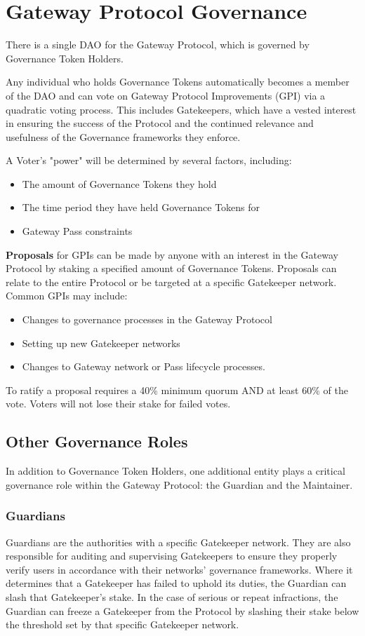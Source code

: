 \section{Gateway Protocol Governance}\label{sec:governance}
There is a single DAO for the Gateway Protocol, which is governed by Governance Token Holders.

Any individual who holds Governance Tokens automatically becomes a member of the DAO and can vote on Gateway Protocol Improvements (GPI) via a quadratic voting process. This includes Gatekeepers, which have a vested interest in ensuring the success of the Protocol and the continued relevance and usefulness of the Governance frameworks they enforce.

A Voter’s "power" will be determined by several factors, including:

\begin{itemize}
\item The amount of Governance Tokens they hold
\item The time period they have held Governance Tokens for
\item Gateway Pass constraints
\end{itemize}

\textbf{Proposals} for GPIs can be made by anyone with an interest in the Gateway Protocol by staking a specified amount of Governance Tokens. Proposals can relate to the entire Protocol or be targeted at a specific Gatekeeper network. Common GPIs may include:

\begin{itemize}
\item Changes to governance processes in the Gateway Protocol
\item Setting up new Gatekeeper networks
\item Changes to Gateway network or Pass lifecycle processes.
\end{itemize}

To ratify a proposal requires a 40\% minimum quorum AND at least 60\% of the vote. Voters will not lose their stake for failed votes.

\subsection{Other Governance Roles}
In addition to Governance Token Holders, one additional entity plays a critical governance role within the Gateway Protocol: the Guardian and the Maintainer.

\subsubsection{Guardians}
Guardians are the authorities with a specific Gatekeeper network. They are also responsible for auditing and supervising
Gatekeepers to ensure they properly verify users in accordance with their networks’ governance frameworks. Where it
determines that a Gatekeeper has failed to uphold its duties, the Guardian can slash that Gatekeeper’s stake.
In the case of serious or repeat infractions, the Guardian can freeze a Gatekeeper from the Protocol by slashing their
stake below the threshold set by that specific Gatekeeper network.

